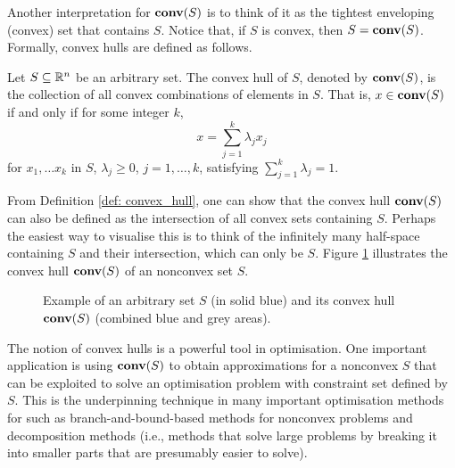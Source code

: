 Another interpretation for $\mathop{\bf conv}(S)$ is to think of it as the tightest enveloping (convex) set that contains $S$. Notice that, if $S$ is convex, then $S = \mathop{\bf conv}(S)$.  Formally, convex hulls are defined as follows.

\begin{definition}\label{def: convex_hull}
	Let $S \subseteq \mathbb{R}^n$ be an arbitrary set. The convex hull of $S$, denoted by $\mathop{\bf conv}(S)$, is the collection of all convex combinations of elements in $S$. That is, $x \in \mathop{\bf conv}(S)$ if and only if for some integer $k$, 
	\begin{equation*}
		x = \sum_{j=1}^k \lambda_jx_j
	\end{equation*}                       
	for $x_1,\dots x_k$ in $S$, $\lambda_j \ge 0$, $j= 1,\dots,k$, satisfying $\sum_{j=1}^k \lambda_j = 1$. 
\end{definition}
%

From Definition \ref{def: convex_hull}, one can show that the convex hull $\mathop{\bf conv}(S)$ can also be defined as the intersection of all convex sets containing $S$. Perhaps the easiest way to visualise this is to think of the infinitely many half-space containing $S$ and their intersection, which can only be $S$. Figure \ref{fig:convex_hull} illustrates the convex hull $\mathop{\bf conv}(S)$ of an nonconvex set $S$.
%
\begin{figure}[H]
\caption{Example of an arbitrary set $S$ (in solid blue) and its convex hull $\mathop{\bf conv}(S)$ (combined blue and grey areas).} \label{fig:convex_hull}
\end{figure}
%
The notion of convex hulls is a powerful tool in optimisation. One important application is using $\mathop{\bf conv}(S)$ to obtain approximations for a nonconvex $S$ that can be exploited to solve an optimisation problem with constraint set defined by $S$. This is the underpinning technique in many important optimisation methods for such as branch-and-bound-based methods for nonconvex problems and decomposition methods (i.e., methods that solve large problems by breaking it into smaller parts that are presumably easier to solve).  


